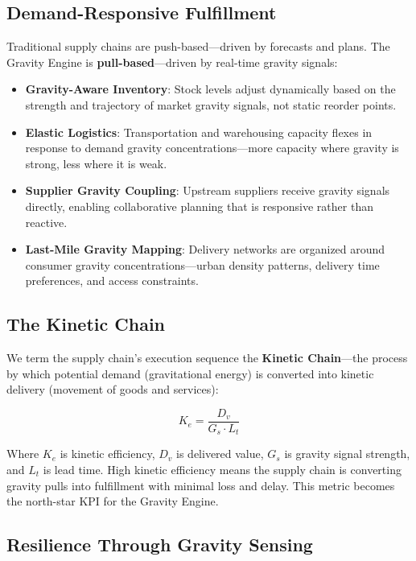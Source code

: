 \documentclass[11pt,a4paper,twocolumn]{article}
\begin{document}
\subsection{Demand-Responsive Fulfillment}

Traditional supply chains are push-based---driven by forecasts and plans. The Gravity Engine is \textbf{pull-based}---driven by real-time gravity signals:

\begin{itemize}[leftmargin=1.5em]
  \item \textbf{Gravity-Aware Inventory}: Stock levels adjust dynamically based on the strength and trajectory of market gravity signals, not static reorder points.
  \item \textbf{Elastic Logistics}: Transportation and warehousing capacity flexes in response to demand gravity concentrations---more capacity where gravity is strong, less where it is weak.
  \item \textbf{Supplier Gravity Coupling}: Upstream suppliers receive gravity signals directly, enabling collaborative planning that is responsive rather than reactive.
  \item \textbf{Last-Mile Gravity Mapping}: Delivery networks are organized around consumer gravity concentrations---urban density patterns, delivery time preferences, and access constraints.
\end{itemize}

\subsection{The Kinetic Chain}

We term the supply chain's execution sequence the \textbf{Kinetic Chain}---the process by which potential demand (gravitational energy) is converted into kinetic delivery (movement of goods and services):

\begin{equation}
K_e = \frac{D_v}{G_s \cdot L_t}
\label{eq:kinetic-efficiency}
\end{equation}

Where $K_e$ is kinetic efficiency, $D_v$ is delivered value, $G_s$ is gravity signal strength, and $L_t$ is lead time. High kinetic efficiency means the supply chain is converting gravity pulls into fulfillment with minimal loss and delay. This metric becomes the north-star KPI for the Gravity Engine.

\subsection{Resilience Through Gravity Sensing}
\end{document}
